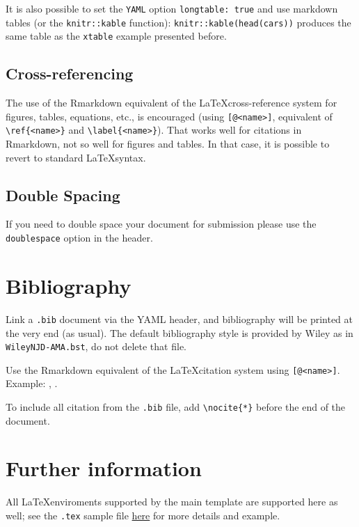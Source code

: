 \documentclass[Royal,times,sageh]{sagej}
\begin{document}
It is also possible to set the \texttt{YAML} option
\texttt{longtable:\ true} and use markdown tables (or the
\texttt{knitr::kable} function): \texttt{knitr::kable(head(cars))}
produces the same table as the \texttt{xtable} example presented before.

\hypertarget{cross-referencing}{%
\subsection{Cross-referencing}\label{cross-referencing}}

The use of the Rmarkdown equivalent of the \LaTeX cross-reference system
for figures, tables, equations, etc., is encouraged (using
\texttt{{[}@\textless{}name\textgreater{}{]}}, equivalent of
\texttt{\textbackslash{}ref\{\textless{}name\textgreater{}\}} and
\texttt{\textbackslash{}label\{\textless{}name\textgreater{}\}}). That
works well for citations in Rmarkdown, not so well for figures and
tables. In that case, it is possible to revert to standard
\LaTeX syntax.

\hypertarget{double-spacing}{%
\subsection{Double Spacing}\label{double-spacing}}

If you need to double space your document for submission please use the
\texttt{doublespace} option in the header.

\hypertarget{bibliography}{%
\section{Bibliography}\label{bibliography}}

Link a \texttt{.bib} document via the YAML header, and bibliography will
be printed at the very end (as usual). The default bibliography style is
provided by Wiley as in \texttt{WileyNJD-AMA.bst}, do not delete that
file.

Use the Rmarkdown equivalent of the \LaTeX citation system using
\texttt{{[}@\textless{}name\textgreater{}{]}}. Example:
\citep{Taylor1937}, \citep{Knupp1999, Kamm2000}.

To include all citation from the \texttt{.bib} file, add
\texttt{\textbackslash{}nocite\{*\}} before the end of the document.

\hypertarget{further-information}{%
\section{Further information}\label{further-information}}

All \LaTeX enviroments supported by the main template are supported here
as well; see the \texttt{.tex} sample file
\href{http://onlinelibrary.wiley.com/journal/10.1002/(ISSN)1097-0258/homepage/la_tex_class_file.htm}{here}
for more details and example.



\end{document}
